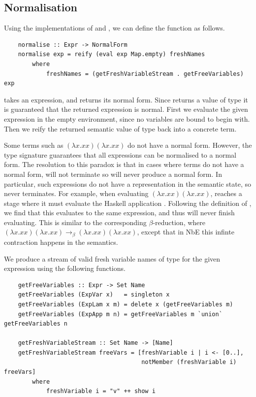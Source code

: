 \subsection{Normalisation}

Using the implementations of  and , we can define the  function as follows.

\begin{lstlisting}
    normalise :: Expr -> NormalForm
    normalise exp = reify (eval exp Map.empty) freshNames
        where
            freshNames = (getFreshVariableStream . getFreeVariables) exp
\end{lstlisting}

 takes an expression, and returns its normal form. Since  returns a value of type  it is guaranteed that the returned expression is normal. First we evaluate the given expression in the empty environment, since no variables are bound to begin with. Then we reify the returned semantic value of type  back into a concrete  term. 

Some terms such as $(\lambda x.x x)(\lambda x.x x)$ do not have a normal form. However, the  type signature guarantees that all expressions can be normalised to a normal form. The resolution to this paradox is that in cases where terms do not have a normal form,  will not terminate so will never produce a normal form. In particular, such expressions do not have a representation in the semantic state, so  never terminates. For example, when evaluating $(\lambda x.x x)(\lambda x.x x)$,  reaches a stage where it must evaluate the Haskell application . Following the definition of , we find that this evaluates to the same expression, and thus will never finish evaluating. This is similar to the corresponding $\beta$-reduction, where $(\lambda x.x x)(\lambda x.x x) \rightarrow_\beta (\lambda x.x x)(\lambda x.x x)$, except that in NbE this infinte contraction happens in the semantics.

We produce a stream of valid fresh variable names  of type \code{[Name]} for the given expression using the following functions.

\begin{lstlisting}
    getFreeVariables :: Expr -> Set Name
    getFreeVariables (ExpVar x)   = singleton x
    getFreeVariables (ExpLam x m) = delete x (getFreeVariables m)
    getFreeVariables (ExpApp m n) = getFreeVariables m `union` getFreeVariables n

    getFreshVariableStream :: Set Name -> [Name]
    getFreshVariableStream freeVars = [freshVariable i | i <- [0..], 
                                       notMember (freshVariable i) freeVars] 
        where
            freshVariable i = "v" ++ show i
\end{lstlisting}

